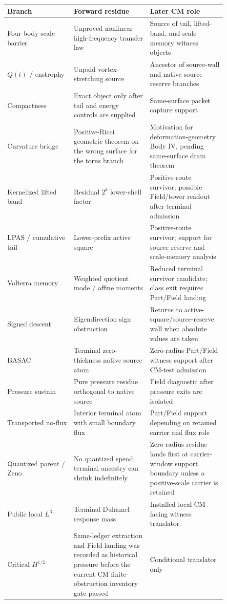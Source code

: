\begin{center}
\begin{tabular}{L{0.27\linewidth}L{0.31\linewidth}L{0.31\linewidth}}
\textbf{Branch} & \textbf{Forward residue} & \textbf{Later CM role} \\
\hline
Four-body scale barrier &
Unproved nonlinear high-frequency transfer law &
Source of tail, lifted-band, and scale-memory witness objects \\
\(Q(t)\) / enstrophy &
Unpaid vortex-stretching source &
Ancestor of source-wall and native source-reserve branches \\
Compactness &
Exact object only after tail and energy controls are supplied &
Same-surface packet capture support \\
Curvature bridge &
Positive-Ricci geometric theorem on the wrong surface for the torus branch &
Motivation for deformation-geometry Body IV, pending same-surface drain theorem \\
Kernelized lifted band &
Residual \(2^k\) lower-shell factor &
Positive-route survivor; possible Field/tower readout after terminal admission \\
LPAS / cumulative tail &
Lower-prefix active square &
Positive-route survivor; support for source-reserve and scale-memory analysis \\
Volterra memory &
Weighted quotient mode / affine moments &
Reduced terminal survivor candidate; class exit requires Part/Field landing \\
Signed descent &
Eigendirection sign obstruction &
Returns to active-square/source-reserve wall when absolute values are taken \\
BASAC &
Terminal zero-thickness native source atom &
Zero-radius Part/Field witness support after CM-test admission \\
Pressure sustain &
Pure pressure residue orthogonal to native source &
Field diagnostic after pressure exits are isolated \\
Transported no-flux &
Interior terminal atom with small boundary flux &
Part/Field support depending on retained carrier and flux role \\
Quantized parent / Zeno &
No quantized spend; terminal ancestry can shrink indefinitely &
Zero-radius residue lands first at carrier-window support boundary unless a positive-scale carrier is retained \\
Public local \(L^3\) &
Terminal Duhamel response mass &
Installed local CM-facing witness translator \\
Critical \(H^{1/2}\) &
Same-ledger extraction and Field landing was recorded as historical pressure before the current CM finite-obstruction inventory gate passed &
Conditional translator only \\
\end{tabular}
\end{center}

